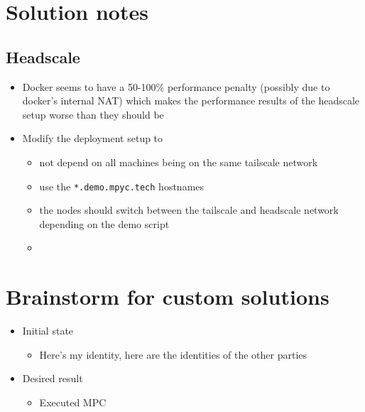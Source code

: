 \hypertarget{solution-notes}{%
\chapter{Solution notes}\label{solution-notes}}

\hypertarget{headscale}{%
\section{Headscale}\label{headscale}}

\begin{itemize}
\tightlist
\item
  Docker seems to have a 50-100\% performance penalty (possibly due to
  docker's internal NAT) which makes the performance results of the
  headscale setup worse than they should be
\item
  Modify the deployment setup to

  \begin{itemize}
  \tightlist
  \item
    not depend on all machines being on the same tailscale network
  \item
    use the \texttt{*.demo.mpyc.tech} hostnames
  \item
    the nodes should switch between the tailscale and headscale network
    depending on the demo script
  \item
  \end{itemize}
\end{itemize}

\hypertarget{brainstorm-for-custom-solutions}{%
\chapter{Brainstorm for custom
solutions}\label{brainstorm-for-custom-solutions}}

\begin{itemize}
\tightlist
\item
  Initial state

  \begin{itemize}
  \tightlist
  \item
    Here's my identity, here are the identities of the other parties
  \end{itemize}
\item
  Desired result

  \begin{itemize}
  \tightlist
  \item
    Executed MPC
  \end{itemize}
\end{itemize}

